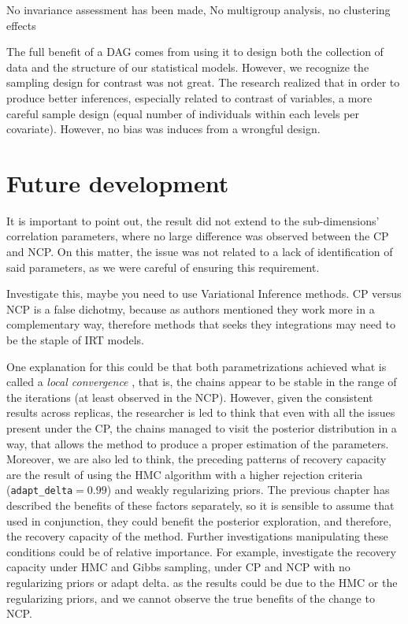 No invariance assessment has been made, No multigroup analysis, no clustering effects



The full benefit of a DAG comes from using it to design both the collection of data and the structure of our statistical models. However, we recognize the sampling design for contrast was not great. The research realized that in order to produce better inferences, especially related to contrast of variables, a more careful sample design (equal number of individuals within each levels per covariate). However, no bias was induces from a wrongful design.

\section{Future development}

It is important to point out, the result did not extend to the sub-dimensions' correlation parameters, where no large difference was observed between the CP and NCP. On this matter, the issue was not related to a lack of identification of said parameters, as we were careful of ensuring this requirement.

Investigate this, maybe you need to use Variational Inference methods. CP versus NCP is a false dichotmy, because as authors mentioned they work more in a complementary way, therefore methods that seeks they integrations may need to be the staple of IRT models.

One explanation for this could be that both parametrizations achieved what is called a \textit{local convergence} \cite{Depaoli_2021}, that is, the chains appear to be stable in the range of the iterations (at least observed in the NCP). However, given the consistent results across replicas, the researcher is led to think that even with all the issues present under the CP, the chains managed to visit the posterior distribution in a way, that allows the method to produce a proper estimation of the parameters. Moreover, we are also led to think, the preceding patterns of recovery capacity are the result of using the HMC algorithm with a higher rejection criteria (\texttt{adapt\_delta}$=0.99$) and weakly regularizing priors. The previous chapter has described the benefits of these factors separately, so it is sensible to assume that used in conjunction, they could benefit the posterior exploration, and therefore, the recovery capacity of the method. Further investigations manipulating these conditions could be of relative importance. For example, investigate the recovery capacity under HMC and Gibbs sampling, under CP and NCP with no regularizing priors or adapt delta. as the results could be due to the HMC or the regularizing priors, and we cannot observe the true benefits of the change to NCP.